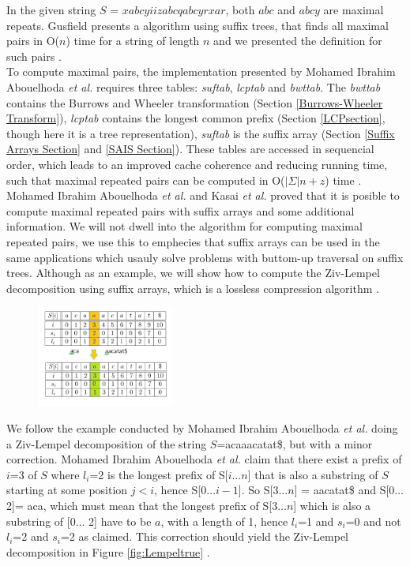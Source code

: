 \documentclass[12pt]{article} %
\begin{document}
In the given string $S$ = $xabcyiizabcqabcyrxar$, both $abc$ and $abcy$ are maximal repeats. Gusfield presents a algorithm using suffix trees, that finds all maximal pairs in O($n$) time for a string of length $n$ and we presented the definition for such pairs \cite{gusfield}.
\\
To compute maximal pairs, the implementation presented by Mohamed Ibrahim Abouelhoda \emph{et al.} \cite{enchancedsuffix} requires three tables: \emph{suftab}, \emph{lcptab} and \emph{bwttab}. The \emph{bwttab} contains the Burrows and Wheeler transformation (Section \ref{Burrows-Wheeler Transform}),  \emph{lcptab} contains the  longest common prefix (Section \ref{LCPsection}, though here it is a tree representation), \emph{suftab} is the suffix array (Section \ref{Suffix Arrays Section} and \ref{SAIS Section})\cite{enchancedsuffix}. These tables are accessed in sequencial order, which leads to an improved cache coherence and reducing running time, such that maximal repeated pairs can be computed in O($|\Sigma|n + z$)  time \cite{enchancedsuffix}. Mohamed Ibrahim Abouelhoda \emph{et al.} \cite{enchancedsuffix} and Kasai \emph{et al.} \cite{Kasai} proved that it is posible to compute maximal repeated pairs with suffix arrays and some additional information. We will not dwell into the algorithm for computing maximal repeated pairs, we use this to emphecies that suffix arrays can be used in the same applications which usauly solve problems with buttom-up traversal on suffix trees. Although as an example, we will show how to compute the Ziv-Lempel decomposition using suffix arrays, which is a lossless compression algorithm \cite{LempelZiv}.

\begin{figure}[H]
    \centering
    \includegraphics[width=0.4\textwidth]{LempelWrong}
    \captionsetup{width=0.8
    \textwidth}
    \caption{}
    \label{fig:LempelWrong}
\end{figure}

We follow the example conducted by Mohamed Ibrahim Abouelhoda \emph{et al.} doing a Ziv-Lempel decomposition of the string $S$=acaaacatat\$, but with a minor correction. Mohamed Ibrahim Abouelhoda \emph{et al.} claim that there exist a prefix of $i$=3 of $S$ where $l_i$=2 is the longest prefix of S[$i \ldots n$] that is also a substring of $S$ starting at some position $j < i$, hence S[$0 \ldots i-1$]. So S[$3 \ldots n$] = aacatat\$ and S[$0 \ldots$ 2]= aca, which must mean that the longest prefix of S[$3 \ldots n$] which is also a substring of [$0 \ldots$ 2] have to be $a$, with a length of 1, hence $l_i$=1 and $s_i$=0 and not $l_i$=2 and $s_i$=2 as claimed. This correction should yield the Ziv-Lempel decomposition in Figure \ref{fig:Lempeltrue} \cite{enchancedsuffix}.
\end{document}
